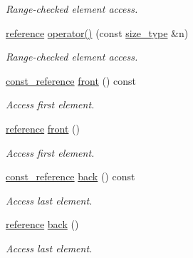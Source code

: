 \begin{DoxyCompactItemize}
\begin{DoxyCompactList}\small\item\em Range-\/checked element access. \end{DoxyCompactList}\item 
\hyperlink{classIceBRG_1_1labeled__array__col__reference_aab5b1a7515a3d5bb8e5ead3f3a8319f6}{reference} \hyperlink{classIceBRG_1_1labeled__array__col__reference_ad9c3ce54c9d1f8d168f46c3f582f6938}{operator()} (const \hyperlink{classIceBRG_1_1labeled__array__col__reference_a5b8295af3ddffec129715ff6b7744b7e}{size\+\_\+type} \&n)
\begin{DoxyCompactList}\small\item\em Range-\/checked element access. \end{DoxyCompactList}\item 
\hyperlink{classIceBRG_1_1labeled__array__col__reference_a2c7ae3d3e5b937e934ad83ea1269127d}{const\+\_\+reference} \hyperlink{classIceBRG_1_1labeled__array__col__reference_ad6ed0320730fca285a785f8aba4debf0}{front} () const 
\begin{DoxyCompactList}\small\item\em Access first element. \end{DoxyCompactList}\item 
\hyperlink{classIceBRG_1_1labeled__array__col__reference_aab5b1a7515a3d5bb8e5ead3f3a8319f6}{reference} \hyperlink{classIceBRG_1_1labeled__array__col__reference_aa284cff0a7a7a6a7e7dbe0c185b1d37d}{front} ()
\begin{DoxyCompactList}\small\item\em Access first element. \end{DoxyCompactList}\item 
\hyperlink{classIceBRG_1_1labeled__array__col__reference_a2c7ae3d3e5b937e934ad83ea1269127d}{const\+\_\+reference} \hyperlink{classIceBRG_1_1labeled__array__col__reference_a029b8b26aad53e4bff9e3d59a70d17a1}{back} () const 
\begin{DoxyCompactList}\small\item\em Access last element. \end{DoxyCompactList}\item 
\hyperlink{classIceBRG_1_1labeled__array__col__reference_aab5b1a7515a3d5bb8e5ead3f3a8319f6}{reference} \hyperlink{classIceBRG_1_1labeled__array__col__reference_a680da5bf0bcc4d3bd7b605a9b9b026c3}{back} ()
\begin{DoxyCompactList}\small\item\em Access last element. \end{DoxyCompactList}\item 

\end{DoxyCompactItemize}
